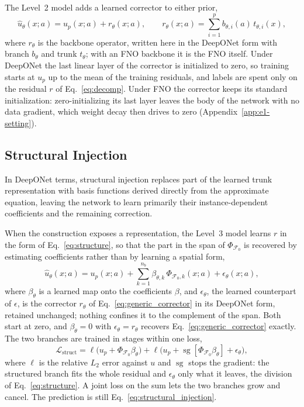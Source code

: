 \documentclass{article}
\begin{document}
The Level~2 model adds a learned corrector to either prior,
\begin{equation}
\hat u_\theta(x;a)=u_p(x;a)+r_\theta(x;a),
\qquad
r_\theta(x;a)=\sum_{i=1}^{p}b_{\theta,i}(a)\,t_{\theta,i}(x),
\label{eq:generic_corrector}
\end{equation}
where $r_\theta$ is the backbone operator, written here in the DeepONet form with branch $b_\theta$ and trunk $t_\theta$; with an FNO backbone it is the FNO itself. Under DeepONet the last linear layer of the corrector is initialized to zero, so training starts at $u_p$ up to the mean of the training residuals, and labels are spent only on the residual $r$ of Eq.~\ref{eq:decomp}. Under \textsc{FNO} the corrector keeps its standard initialization: zero-initializing its last layer leaves the body of the network with no data gradient, which weight decay then drives to zero (Appendix~\ref{app:e1-setting}).

\subsection{Structural Injection}
\label{sec:structural_injection}

In DeepONet terms, structural injection replaces part of the learned trunk representation with basis functions derived directly from the approximate equation, leaving the network to learn primarily their instance-dependent coefficients and the remaining correction.

When the construction exposes a representation, the Level~3 model learns $r$ in the form of Eq.~\ref{eq:structure}, so that the part in the span of $\Phi_{\mathcal{F}_0}$ is recovered by estimating coefficients rather than by learning a spatial form,
\begin{equation}
\hat u_\theta(x;a)=u_p(x;a)+\sum_{k=1}^{n_b}\beta_{\theta,k}\,\Phi_{\mathcal{F}_0,k}(x;a)+\epsilon_\theta(x;a),
\label{eq:structural_injection}
\end{equation}
where $\beta_\theta$ is a learned map onto the coefficients $\beta$, and $\epsilon_\theta$, the learned counterpart of $\epsilon$, is the corrector $r_\theta$ of Eq.~\ref{eq:generic_corrector} in its DeepONet form, retained unchanged; nothing confines it to the complement of the span. Both start at zero, and $\beta_\theta=0$ with $\epsilon_\theta=r_\theta$ recovers Eq.~\ref{eq:generic_corrector} exactly. The two branches are trained in stages within one loss,
\begin{equation}
\mathcal{L}_{\mathrm{struct}}
=\ell\bigl(u_p+\Phi_{\mathcal{F}_0}\beta_\theta\bigr)
+\ell\bigl(u_p+\operatorname{sg}[\Phi_{\mathcal{F}_0}\beta_\theta]+\epsilon_\theta\bigr),
\label{eq:staged-loss}
\end{equation}
where $\ell$ is the relative $L_2$ error against $u$ and $\operatorname{sg}$ stops the gradient: the structured branch fits the whole residual and $\epsilon_\theta$ only what it leaves, the division of Eq.~\ref{eq:structure}. A joint loss on the sum lets the two branches grow and cancel. The prediction is still Eq.~\ref{eq:structural_injection}.
\end{document}
